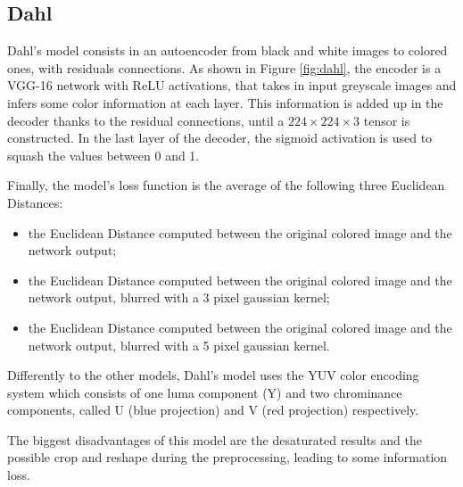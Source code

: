 \subsection{Dahl}

Dahl's model consists in an autoencoder from black and white images to colored ones, with
residuals connections.
As shown in Figure \ref{fig:dahl}, the encoder is a VGG-16 network with ReLU activations, that takes in input greyscale images and infers
some color information at each layer. This information is added up in the decoder thanks to the residual
connections, until a $224 \times 224 \times 3$ tensor is constructed. In the last layer of the decoder, the sigmoid activation is used to squash the values between 0 and 1.

Finally, the model's loss function is the average of the following three Euclidean Distances:
\begin{itemize}
    \item the Euclidean Distance computed between the original colored image and the network output;
    \item the Euclidean Distance computed between the original colored image and the network output, blurred with a 3 pixel gaussian kernel;
    \item the Euclidean Distance computed between the original colored image and the network output, blurred with a 5 pixel gaussian kernel.
\end{itemize}

Differently to the other models, Dahl's model uses the YUV color encoding system which consists of one luma
component (Y) and two chrominance components, called U (blue projection) and V (red projection) respectively.

The biggest disadvantages of this model are the desaturated results and the possible crop and reshape during the preprocessing, leading to some information loss.



